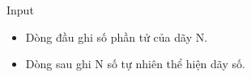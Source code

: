 Input
\begin{itemize}
	\item Dòng đầu ghi số phần tử của dãy N.
	\item Dòng sau ghi N số tự nhiên thể hiện dãy số.
\end{itemize}